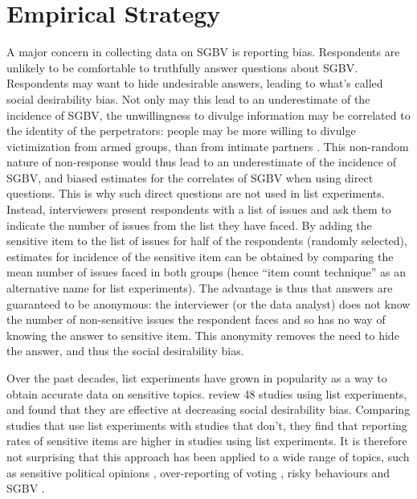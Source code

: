\section{Empirical Strategy}
A major concern in collecting data on SGBV is reporting bias. Respondents are unlikely to be comfortable to truthfully answer questions about SGBV. Respondents may want to hide undesirable answers, leading to what's called social desirability bias. Not only may this lead to an underestimate of the incidence of SGBV, the unwillingness to divulge information may be correlated to the identity of the perpetrators: people may be more willing to divulge victimization from armed groups, than from intimate partners \citep{Stark2017}. This non-random nature of non-response would thus lead to an underestimate of the incidence of SGBV, and biased estimates for the correlates of SGBV when using direct questions. This is why such direct questions are not used in list experiments. Instead, interviewers present respondents with a list of issues and ask them to indicate the number of issues from the list they have faced. By adding the sensitive item to the list of issues for half of the respondents (randomly selected), estimates for incidence of the sensitive item can be obtained by comparing the mean number of issues faced in both groups (hence ``item count technique'' as an alternative name for list experiments). The advantage is thus that answers are guaranteed to be anonymous: the interviewer (or the data analyst) does not know the number of non-sensitive issues the respondent faces and so has no way of knowing the answer to sensitive item. This anonymity removes the need to hide the answer, and thus the social desirability bias. 

Over the past decades, list experiments have grown in popularity as a way to obtain accurate data on sensitive topics. \cite{Holbrook2010} review 48 studies using list experiments, and found that they are effective at decreasing social desirability bias. Comparing studies that use list experiments with studies that don't, they find that reporting rates of sensitive items are higher in studies using list experiments. It is therefore not surprising that this approach has been applied to a wide range of topics, such as sensitive political opinions \citep{Frye2017,Blair2014,Meng2017,Corstange2009}, over-reporting of voting \citep{Holbrook2010}, risky behaviours \citep{LaBrie2000} and SGBV \citep{Bulte2019,Peterman2018}.

